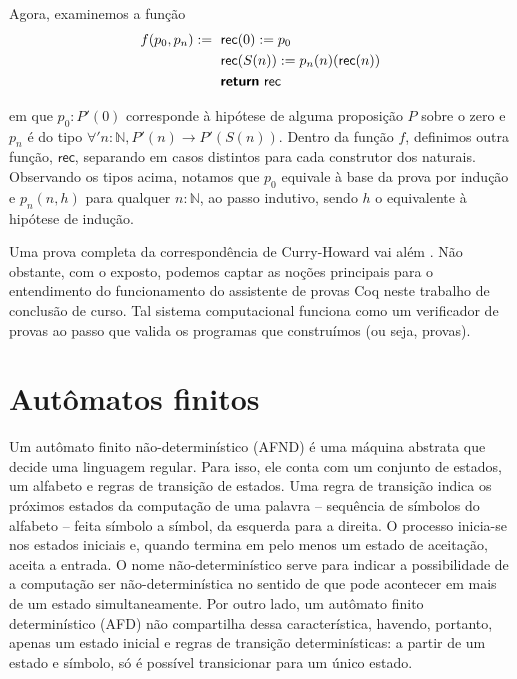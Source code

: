 Agora, examinemos a função \begin{equation*}\begin{split}
f(p_0, p_n) :=\textsf{ }& \textsf{rec}(0) := p_0 \\
& \textsf{rec}(S (n)) := p_n (n) (\textsf{rec}(n)) \\
& \textsf{\textbf{return} }\textsf{rec}
\end{split}\end{equation*}

\noindent
em que $p_0 : P'(0)$ corresponde à hipótese de alguma proposição $P$ sobre o zero e $p_n$ é do tipo $\forall' n:\mathbb{N}, P'(n) \to P'(S(n))$. Dentro da função $f$, definimos outra função, $\textsf{rec}$, separando em casos distintos para cada construtor dos naturais. Observando os tipos acima, notamos que $p_0$ equivale à base da prova por indução e $p_n(n, h)$ para qualquer $n:\mathbb{N}$, ao passo indutivo, sendo $h$ o equivalente à hipótese de indução.

Uma prova completa da correspondência de Curry-Howard vai além \cite{rafael_tcc}. Não obstante, com o exposto, podemos captar as noções principais para o entendimento do funcionamento do assistente de provas Coq neste trabalho de conclusão de curso. Tal sistema computacional funciona como um verificador de provas ao passo que valida os programas que construímos (ou seja, provas).

\section{Autômatos finitos}

Um autômato finito não-determinístico (AFND) é uma máquina abstrata que decide uma linguagem regular. Para isso, ele conta com um conjunto de estados, um alfabeto e regras de transição de estados. Uma regra de transição indica os próximos estados da computação de uma palavra -- sequência de símbolos do alfabeto -- feita símbolo a símbol, da esquerda para a direita. O processo inicia-se nos estados iniciais e, quando termina em pelo menos um estado de aceitação, aceita a entrada. O nome não-determinístico serve para indicar a possibilidade de a computação ser não-determinística no sentido de que pode acontecer em mais de um estado simultaneamente. Por outro lado, um autômato finito determinístico (AFD) não compartilha dessa característica, havendo, portanto, apenas um estado inicial e regras de transição determinísticas: a partir de um estado e símbolo, só é possível transicionar para um único estado.

